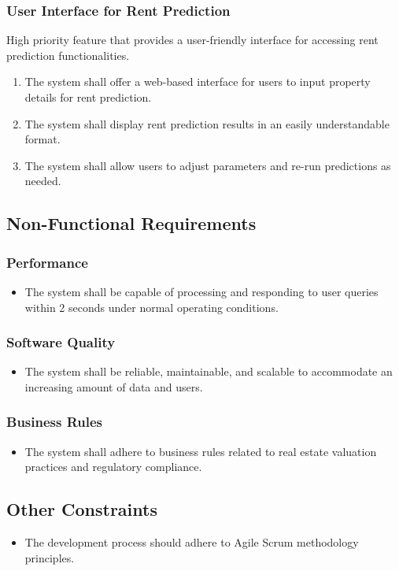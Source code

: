 \documentclass[12pt]{article}
\begin{document}
\subsubsection{User Interface for Rent Prediction}
High priority feature that provides a user-friendly interface for accessing rent prediction functionalities.
\begin{enumerate}
    \item The system shall offer a web-based interface for users to input property details for rent prediction.
    \item The system shall display rent prediction results in an easily understandable format.
    \item The system shall allow users to adjust parameters and re-run predictions as needed.
\end{enumerate}

\subsection{Non-Functional Requirements}

\subsubsection{Performance}
\begin{itemize}
    \item The system shall be capable of processing and responding to user queries within 2 seconds under normal operating conditions.
\end{itemize}

\subsubsection{Software Quality}
\begin{itemize}
    \item The system shall be reliable, maintainable, and scalable to accommodate an increasing amount of data and users.
\end{itemize}

\subsubsection{Business Rules}
\begin{itemize}
    \item The system shall adhere to business rules related to real estate valuation practices and regulatory compliance.
\end{itemize}

\subsection{Other Constraints}
\begin{itemize}
    \item The development process should adhere to Agile Scrum methodology principles.
\end{itemize}
\newpage
\end{document}
